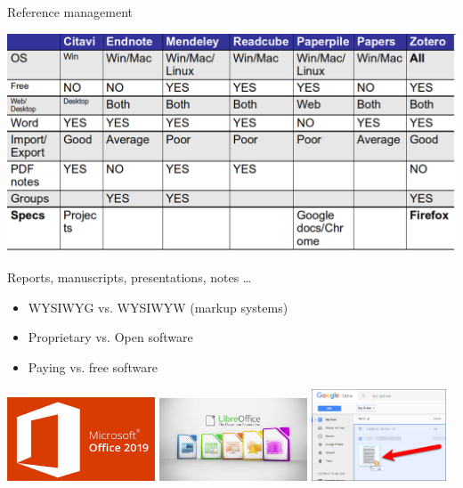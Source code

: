 \documentclass[10pt]{beamer}%
\begin{document}
\begin{frame}{Reference management}

\includegraphics[width=\textwidth]{Figures/comp}

\end{frame}

\begin{frame}{Reports, manuscripts, presentations, notes \dots}
    \begin{itemize}
     \item WYSIWYG vs. WYSIWYW (markup systems)
     \item Proprietary vs. Open software
     \item Paying vs. free software
    \end{itemize}

    \pause
    
    \includegraphics[width=0.33\textwidth]{Figures/microsoft}
    \includegraphics[width=0.33\textwidth]{Figures/libreoff}
    \includegraphics[width=0.3\textwidth]{Figures/googledrive}
    
\end{frame}
\end{document}
